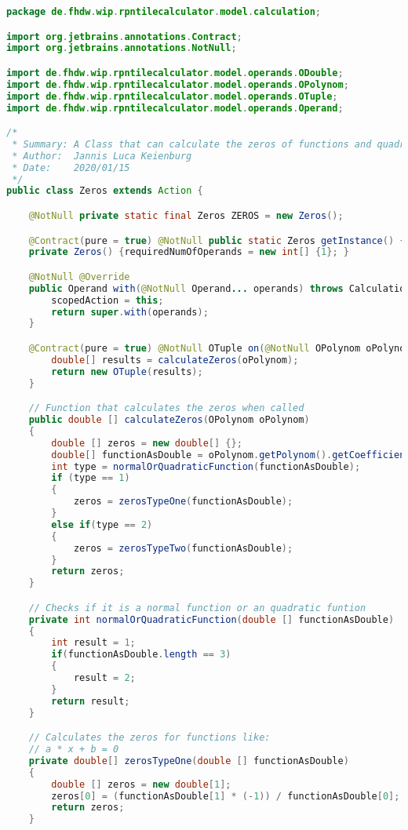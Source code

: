 \begin{lstlisting}[caption=Zeros (Keienburg),label=list:Zeros,language=Java]
package de.fhdw.wip.rpntilecalculator.model.calculation;

import org.jetbrains.annotations.Contract;
import org.jetbrains.annotations.NotNull;

import de.fhdw.wip.rpntilecalculator.model.operands.ODouble;
import de.fhdw.wip.rpntilecalculator.model.operands.OPolynom;
import de.fhdw.wip.rpntilecalculator.model.operands.OTuple;
import de.fhdw.wip.rpntilecalculator.model.operands.Operand;

/*
 * Summary: A Class that can calculate the zeros of functions and quadratic functions.
 * Author:  Jannis Luca Keienburg
 * Date:    2020/01/15
 */
public class Zeros extends Action {

    @NotNull private static final Zeros ZEROS = new Zeros();

    @Contract(pure = true) @NotNull public static Zeros getInstance() { return ZEROS; }
    private Zeros() {requiredNumOfOperands = new int[] {1}; }

    @NotNull @Override
    public Operand with(@NotNull Operand... operands) throws CalculationException {
        scopedAction = this;
        return super.with(operands);
    }

    @Contract(pure = true) @NotNull OTuple on(@NotNull OPolynom oPolynom) {
        double[] results = calculateZeros(oPolynom);
        return new OTuple(results);
    }

    // Function that calculates the zeros when called
    public double [] calculateZeros(OPolynom oPolynom)
    {
        double [] zeros = new double[] {};
        double[] functionAsDouble = oPolynom.getPolynom().getCoefficients();
        int type = normalOrQuadraticFunction(functionAsDouble);
        if (type == 1)
        {
            zeros = zerosTypeOne(functionAsDouble);
        }
        else if(type == 2)
        {
            zeros = zerosTypeTwo(functionAsDouble);
        }
        return zeros;
    }

    // Checks if it is a normal function or an quadratic funtion
    private int normalOrQuadraticFunction(double [] functionAsDouble)
    {
        int result = 1;
        if(functionAsDouble.length == 3)
        {
            result = 2;
        }
        return result;
    }

    // Calculates the zeros for functions like:
    // a * x + b = 0
    private double[] zerosTypeOne(double [] functionAsDouble)
    {
        double [] zeros = new double[1];
        zeros[0] = (functionAsDouble[1] * (-1)) / functionAsDouble[0];
        return zeros;
    }


\end{lstlisting}
